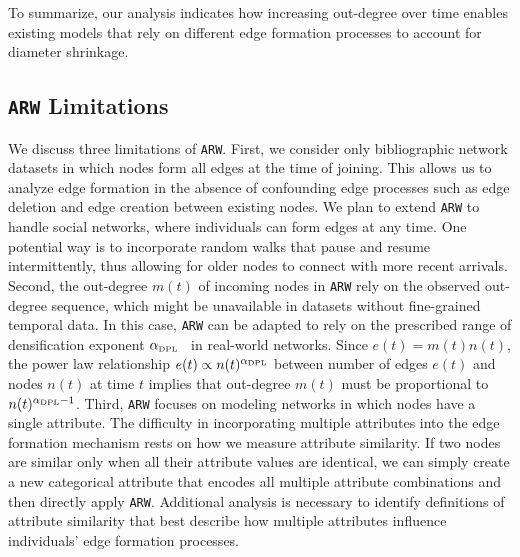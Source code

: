 To summarize, our analysis indicates how increasing out-degree over time enables
existing models that rely on different edge formation processes to account for
diameter shrinkage.


\subsection{\texttt{ARW} Limitations}
We discuss three limitations of \texttt{ARW}. First, we  consider only
bibliographic  network datasets in which nodes form all edges at the time of joining.
This allows us to analyze edge formation in the absence of confounding edge
processes such as edge deletion and edge creation between existing nodes. We
plan to extend \texttt{ARW} to handle social networks, where individuals can
form edges at any time. One potential way is to incorporate random walks that
pause and resume intermittently, thus allowing for older nodes to connect with
more recent arrivals.
Second, the out-degree $m(t)$ of incoming nodes in \texttt{ARW} rely on the
observed out-degree sequence, which might be unavailable in
datasets without fine-grained temporal data. In this case, \texttt{ARW}
can be adapted to rely on the prescribed range of densification exponent $\alpha_{\tiny \mbox{DPL}}$~\cite{leskovec2005graphs}
in real-world networks.
Since $e(t)=m(t)n(t)$, the power law relationship $e(t) \propto n(t)^{\alpha_{\tiny \mbox{DPL}}}$ between
number of edges $e(t)$ and nodes $n(t)$ at time $t$ implies that out-degree $m(t)$ must be proportional
to $n(t)^{\alpha_{\tiny \mbox{DPL}}-1}$.
Third, \texttt{ARW} focuses on modeling networks in which nodes have a single attribute.
The difficulty in incorporating multiple attributes into the edge formation mechanism rests
on how we measure attribute similarity. If two nodes are similar only when all their
attribute values are identical, we can simply create a new categorical attribute that encodes all
multiple attribute combinations and then directly apply \texttt{ARW}.
Additional analysis is necessary to identify definitions of attribute similarity that best
describe how multiple attributes influence individuals' edge formation processes.

